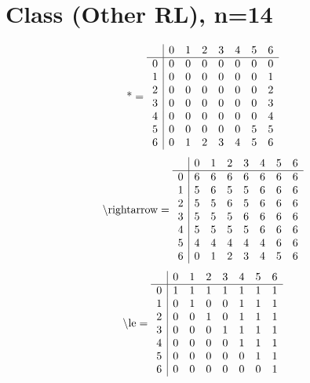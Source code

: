 \documentclass[11pt]{article}
\begin{document}
\section{Class (Other RL), n=14}
\[\text{*} = 
\begin{array}{r | r r r r r r r}
 & 0 & 1 & 2 & 3 & 4 & 5 & 6 \\ \hline
0 & 0 & 0 & 0 & 0 & 0 & 0 & 0 \\
1 & 0 & 0 & 0 & 0 & 0 & 0 & 1 \\
2 & 0 & 0 & 0 & 0 & 0 & 0 & 2 \\
3 & 0 & 0 & 0 & 0 & 0 & 0 & 3 \\
4 & 0 & 0 & 0 & 0 & 0 & 0 & 4 \\
5 & 0 & 0 & 0 & 0 & 0 & 5 & 5 \\
6 & 0 & 1 & 2 & 3 & 4 & 5 & 6 \\
\end{array}
\]
\[\text{\textbackslash rightarrow} = 
\begin{array}{r | r r r r r r r}
 & 0 & 1 & 2 & 3 & 4 & 5 & 6 \\ \hline
0 & 6 & 6 & 6 & 6 & 6 & 6 & 6 \\
1 & 5 & 6 & 5 & 5 & 6 & 6 & 6 \\
2 & 5 & 5 & 6 & 5 & 6 & 6 & 6 \\
3 & 5 & 5 & 5 & 6 & 6 & 6 & 6 \\
4 & 5 & 5 & 5 & 5 & 6 & 6 & 6 \\
5 & 4 & 4 & 4 & 4 & 4 & 6 & 6 \\
6 & 0 & 1 & 2 & 3 & 4 & 5 & 6 \\
\end{array}
\]
\[\text{\textbackslash le} = 
\begin{array}{r | r r r r r r r}
 & 0 & 1 & 2 & 3 & 4 & 5 & 6 \\ \hline
0 & 1 & 1 & 1 & 1 & 1 & 1 & 1 \\
1 & 0 & 1 & 0 & 0 & 1 & 1 & 1 \\
2 & 0 & 0 & 1 & 0 & 1 & 1 & 1 \\
3 & 0 & 0 & 0 & 1 & 1 & 1 & 1 \\
4 & 0 & 0 & 0 & 0 & 1 & 1 & 1 \\
5 & 0 & 0 & 0 & 0 & 0 & 1 & 1 \\
6 & 0 & 0 & 0 & 0 & 0 & 0 & 1 \\
\end{array}
\]
\end{document}
